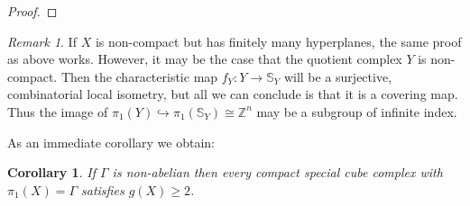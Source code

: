 \documentclass[11pt]{amsart}
\numberwithin{thm}{section}
\newtheorem{lemma}[thm]{Lemma}
\newtheorem{corollary}[thm]{Corollary}
\theoremstyle{remark}
\newtheorem{rmk}[thm]{Remark}
\theoremstyle{definition}
\newcommand{\Z}{\mathbb{Z}}
\newcommand{\Sa}{\mathbb{S}}
\begin{document}
\begin{proof}
%
%
\end{proof}

\begin{rmk} If $X$ is non-compact but has finitely many hyperplanes, the same proof as above works. However, it may be the case that the quotient complex $Y$ is non-compact.  Then the characteristic map  $f_Y:Y\rightarrow \Sa_Y$ will be a surjective, combinatorial local isometry, but all we can conclude is that it is a covering map.  Thus the image of $\pi_1(Y)\hookrightarrow\pi_1(\Sa_Y)\cong\Z^n$ may be a subgroup of infinite index.
\end{rmk}

\noindent
As an immediate corollary we obtain:

\begin{corollary}\label{unsplit} If $\Gamma$ is non-abelian then every compact special cube complex with $\pi_1(X)=\Gamma$ satisfies $g(X)\geq2$. 
\end{corollary}
\end{document}
